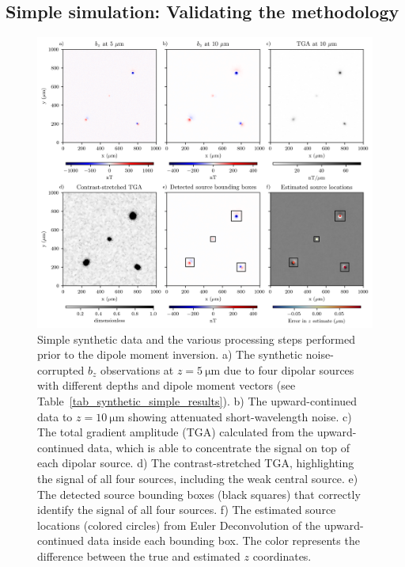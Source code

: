 \subsection{Simple simulation: Validating the methodology}

\begin{figure}[tb!]
  \centering
  \includegraphics[width=1\linewidth]{figures/simple-synthetic-data.png}
  \caption{
    Simple synthetic data and the various processing steps performed prior to the dipole moment inversion.
    a) The synthetic noise-corrupted $b_z$ observations at
    $z = \qty{5}{\micro\meter}$ due to four dipolar sources with different
    depths and dipole moment vectors
    (see Table~\ref{tab_synthetic_simple_results}).
    b) The upward-continued data to $z = \qty{10}{\micro\meter}$ showing
    attenuated short-wavelength noise.
    c) The total gradient amplitude (TGA) calculated from the
    upward-continued data, which is able to concentrate the signal on top
    of each dipolar source.
    d) The contrast-stretched TGA, highlighting the signal of all four
    sources, including the weak central source.
    e) The detected source bounding boxes (black squares) that correctly
    identify the signal of all four sources.
    f) The estimated source locations (colored circles) from Euler
    Deconvolution of the upward-continued data inside each bounding box.
    The color represents the difference between the true and estimated
    $z$ coordinates.
  }
  \label{fig_synthetic_simple_data}
\end{figure}

